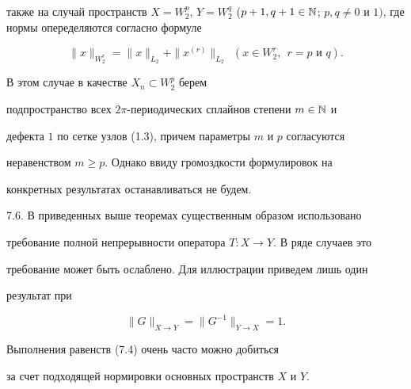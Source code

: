 также на случай пространств $X=W_2^p$, $Y=W_2^q$ ($p+1, q+1 \in \N$; $p,q\ne


0$ и $1)$, где нормы опеределяются согласно формуле


$$


\|x\|_{W_2^r}=\|x\|_{L_2}+\|x^{(r)}\|_{L_2}\ \ (x\in W_2^r,\ \ r=p


\text{ и } q).


$$


В этом случае в качестве $X_n \subset W_2^p$ берем


подпространство всех $2\pi$-периодических сплайнов степени $m \in \Bbb N$ и


дефекта $1$ по сетке узлов (1.3), причем параметры $m$ и $p$ согласуются


неравенством $m\ge p$. Однако ввиду громоздкости формулировок на


конкретных результатах останавливаться не будем.


\smallskip





7.6. В приведенных выше теоремах существенным образом использовано


требование полной непрерывности оператора $T:X\to Y$. В ряде случаев это


требование может быть ослаблено. Для иллюстрации приведем лишь один


результат при 


\begin{equation}


\|G\|_{X\to Y}=\|G^{-1}\|_{Y\to X}=1.


\end{equation}


Выполнения равенств (7.4) очень часто можно добиться


за счет подходящей нормировки основных пространств $X$ и $Y$.





